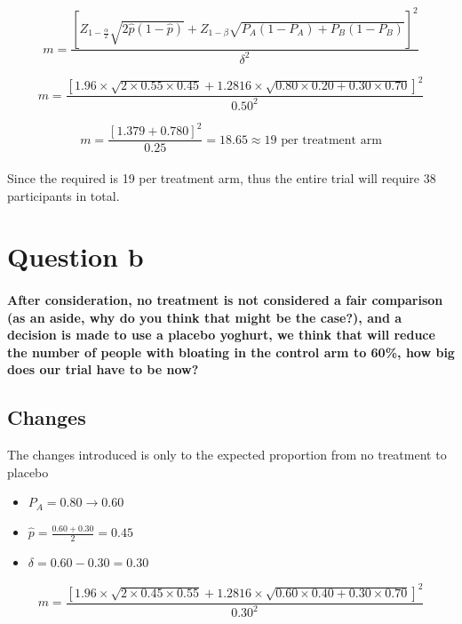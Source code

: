 \documentclass{article}
\begin{document}
\begin{equation*}
    m = \dfrac{[Z_{1-\frac{\alpha}{2}} \sqrt{2\hat{p} (1-\hat{p})} + Z_{1-\beta} \sqrt{ P_A (1-P_A) + P_B (1-P_B) }]^2}
        {\delta^2}
\end{equation*}

\begin{equation*}
    m = \dfrac{[1.96 \times \sqrt{2 \times 0.55 \times 0.45} + 1.2816 \times \sqrt{0.80 \times 0.20 + 0.30 \times 0.70} ]^2}{0.50^2}
\end{equation*}

\begin{equation*}
    m = \dfrac{[1.379 + 0.780]^2}{0.25}
      = 18.65 \approx 19 \text{ per treatment arm}
\end{equation*}
\\
Since the required is 19 per treatment arm, thus the entire trial will require 38 participants in total.

\section*{Question b}
\paragraph{After consideration, no treatment is not considered a fair comparison (as an aside, why do you think that might be
the case?), and a decision is made to use a placebo yoghurt, we think that will reduce the number of people with
bloating in the control arm to 60\%, how big does our trial have to be now?}

\subsection*{Changes}
The changes introduced is only to the expected proportion from no treatment to placebo
\\
\begin{itemize}
    \item $P_A = 0.80 \rightarrow 0.60$
    \item $\hat{p} = \frac{0.60 + 0.30}{2} = 0.45$
    \item $\delta = 0.60 - 0.30 = 0.30$
\end{itemize}

\begin{equation*}
    m = \dfrac{[1.96 \times \sqrt{2 \times 0.45 \times 0.55} + 1.2816 \times \sqrt{0.60 \times 0.40 + 0.30 \times 0.70} ]^2}{0.30^2}
\end{equation*}
\end{document}
